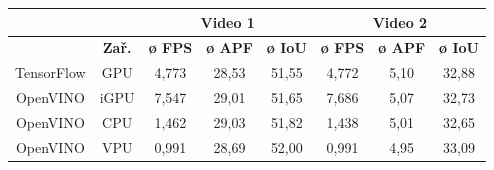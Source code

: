 \begin{table}[H]
  \centering
  \begin{tabular}{cc|ccc|ccc|}
  \cline{3-8}
                                                               &                              & \multicolumn{3}{c|}{\cellcolor[HTML]{CBCEFB}\textbf{Video 1}}                                                                              & \multicolumn{3}{c|}{\cellcolor[HTML]{CBCEFB}\textbf{Video 2}}                                                                              \\ \hline
  \rowcolor[HTML]{E0DBDB} 
  \multicolumn{1}{|c|}{\cellcolor[HTML]{E0DBDB}\textbf{Model}} & \textbf{Zař.}                & \multicolumn{1}{c|}{\cellcolor[HTML]{E0DBDB}\textbf{ø FPS}} & \multicolumn{1}{c|}{\cellcolor[HTML]{E0DBDB}\textbf{ø APF}} & \textbf{ø IoU} & \multicolumn{1}{c|}{\cellcolor[HTML]{E0DBDB}\textbf{ø FPS}} & \multicolumn{1}{c|}{\cellcolor[HTML]{E0DBDB}\textbf{ø APF}} & \textbf{ø IoU} \\ \hline
  \multicolumn{1}{|c|}{\cellcolor[HTML]{E0DBDB}TensorFlow}     & \cellcolor[HTML]{E0DBDB}GPU  & \multicolumn{1}{c|}{4,773}                                  & \multicolumn{1}{c|}{28,53}                                  & 51,55          & \multicolumn{1}{c|}{4,772}                                  & \multicolumn{1}{c|}{5,10}                                   & 32,88          \\ \hline
  \multicolumn{1}{|c|}{\cellcolor[HTML]{E0DBDB}OpenVINO}       & \cellcolor[HTML]{E0DBDB}iGPU & \multicolumn{1}{c|}{7,547}                                  & \multicolumn{1}{c|}{29,01}                                  & 51,65          & \multicolumn{1}{c|}{7,686}                                  & \multicolumn{1}{c|}{5,07}                                   & 32,73          \\ \hline
  \multicolumn{1}{|c|}{\cellcolor[HTML]{E0DBDB}OpenVINO}       & \cellcolor[HTML]{E0DBDB}CPU  & \multicolumn{1}{c|}{1,462}                                  & \multicolumn{1}{c|}{29,03}                                  & 51,82          & \multicolumn{1}{c|}{1,438}                                  & \multicolumn{1}{c|}{5,01}                                   & 32,65          \\ \hline
  \multicolumn{1}{|c|}{\cellcolor[HTML]{E0DBDB}OpenVINO}       & \cellcolor[HTML]{E0DBDB}VPU  & \multicolumn{1}{c|}{0,991}                                  & \multicolumn{1}{c|}{28,69}                                  & 52,00          & \multicolumn{1}{c|}{0,991}                                  & \multicolumn{1}{c|}{4,95}                                   & 33,09          \\ \hline

\end{tabular}
\end{table}
